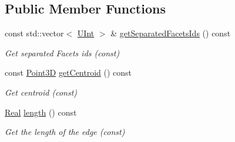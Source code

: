 \subsection*{Public Member Functions}
\begin{DoxyCompactItemize}
\item 
const std\+::vector$<$ \hyperlink{namespaceFVCode3D_a4bf7e328c75d0fd504050d040ebe9eda}{U\+Int} $>$ \& \hyperlink{classFVCode3D_1_1Rigid__Mesh_1_1Edge_aaf3e4807dd9dc28f6db0af6de69f6114}{get\+Separated\+Facets\+Ids} () const 
\begin{DoxyCompactList}\small\item\em Get separated Facets ids (const) \end{DoxyCompactList}\item 
const \hyperlink{classFVCode3D_1_1Point3D}{Point3D} \hyperlink{classFVCode3D_1_1Rigid__Mesh_1_1Edge_a53b678074c79d7d3115096da7c47e68e}{get\+Centroid} () const 
\begin{DoxyCompactList}\small\item\em Get centroid (const) \end{DoxyCompactList}\item 
\hyperlink{namespaceFVCode3D_a40c1f5588a248569d80aa5f867080e83}{Real} \hyperlink{classFVCode3D_1_1Rigid__Mesh_1_1Edge_a3ef3549d709a4b537437f9e3e7f3e67b}{length} () const 
\begin{DoxyCompactList}\small\item\em Get the length of the edge (const) \end{DoxyCompactList}\end{DoxyCompactItemize}
